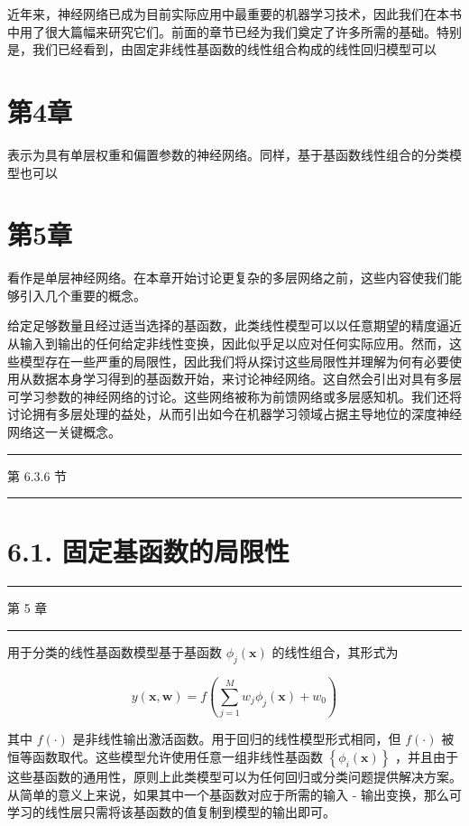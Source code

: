 \documentclass[10pt]{report}
\newcommand{\HRule}{\begin{center}\rule{0.9\linewidth}{0.2mm}\end{center}}
\begin{document}
近年来，神经网络已成为目前实际应用中最重要的机器学习技术，因此我们在本书中用了很大篇幅来研究它们。前面的章节已经为我们奠定了许多所需的基础。特别是，我们已经看到，由固定非线性基函数的线性组合构成的线性回归模型可以

\section*{第4章}

表示为具有单层权重和偏置参数的神经网络。同样，基于基函数线性组合的分类模型也可以

\section*{第5章}

看作是单层神经网络。在本章开始讨论更复杂的多层网络之前，这些内容使我们能够引入几个重要的概念。

给定足够数量且经过适当选择的基函数，此类线性模型可以以任意期望的精度逼近从输入到输出的任何给定非线性变换，因此似乎足以应对任何实际应用。然而，这些模型存在一些严重的局限性，因此我们将从探讨这些局限性并理解为何有必要使用从数据本身学习得到的基函数开始，来讨论神经网络。这自然会引出对具有多层可学习参数的神经网络的讨论。这些网络被称为前馈网络或多层感知机。我们还将讨论拥有多层处理的益处，从而引出如今在机器学习领域占据主导地位的深度神经网络这一关键概念。

\HRule

第 6.3.6 节

\HRule

\section*{6.1. 固定基函数的局限性}

\HRule

第 5 章

\HRule

用于分类的线性基函数模型基于基函数 \({\phi }_{j}\left( \mathbf{x}\right)\) 的线性组合，其形式为

\[
y\left( {\mathbf{x},\mathbf{w}}\right)  = f\left( {\mathop{\sum }\limits_{{j = 1}}^{M}{w}_{j}{\phi }_{j}\left( \mathbf{x}\right)  + {w}_{0}}\right)  \tag{6.1}
\]

其中 \(f\left( \cdot \right)\) 是非线性输出激活函数。用于回归的线性模型形式相同，但 \(f\left( \cdot \right)\) 被恒等函数取代。这些模型允许使用任意一组非线性基函数 \(\left\{  {{\phi }_{i}\left( \mathbf{x}\right) }\right\}\) ，并且由于这些基函数的通用性，原则上此类模型可以为任何回归或分类问题提供解决方案。从简单的意义上来说，如果其中一个基函数对应于所需的输入 - 输出变换，那么可学习的线性层只需将该基函数的值复制到模型的输出即可。
\end{document}
